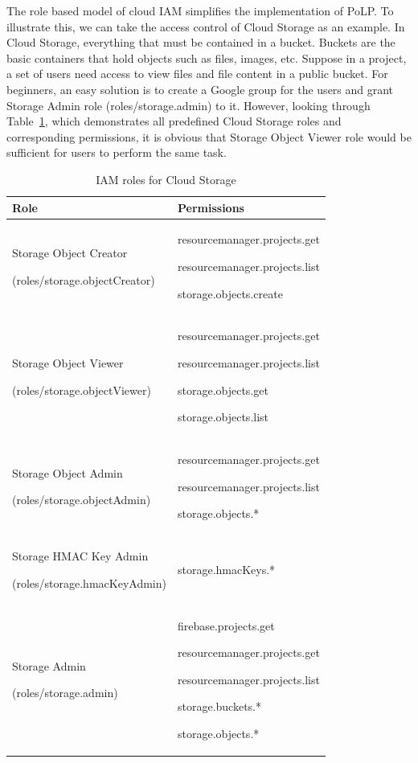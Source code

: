 \documentclass[a4paper,twoside]{article}
\begin{document}
The role based model of cloud IAM simplifies the implementation of PoLP. To illustrate this, we can take the access control of Cloud Storage as an example. In Cloud Storage, everything that must be contained in a bucket. Buckets are the basic containers that hold objects such as files, images, etc. Suppose in a project, a set of users need access to view files and file content in a public bucket. For beginners, an easy solution is to create a Google group for the users and grant Storage Admin role (roles/storage.admin) to it. However, looking through Table~\ref{table:sto-role}, which demonstrates all predefined Cloud Storage roles and corresponding permissions, it is obvious that Storage Object Viewer role would be sufficient for users to perform the same task. 
\begin{table}[t]
    \caption{IAM roles for Cloud Storage} \centering
    \begin{tabular}{|p{4.2cm}|p{4cm}|}
    \hline
    Role & Permissions\\
    \hline
    \hline
    Storage Object Creator\par(roles/storage.objectCreator) &  resourcemanager.projects.get \par resourcemanager.projects.list \par storage.objects.create \\ %
    \hline
    Storage Object Viewer\par(roles/storage.objectViewer) & resourcemanager.projects.get\par resourcemanager.projects.list\par storage.objects.get\par storage.objects.list \\ %
    \hline
    Storage Object Admin\par(roles/storage.objectAdmin) & resourcemanager.projects.get \par resourcemanager.projects.list\par storage.objects.*\\ %
    \hline
    Storage HMAC Key Admin\par(roles/storage.hmacKeyAdmin) &storage.hmacKeys.*\\
    \hline
     Storage Admin\par(roles/storage.admin) &firebase.projects.get\par resourcemanager.projects.get\par resourcemanager.projects.list\par storage.buckets.*\par storage.objects.*\\
    \hline
    \end{tabular}
    \label{table:sto-role}
\end{table}
\end{document}
